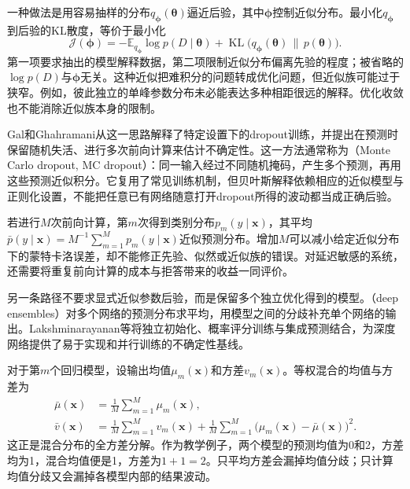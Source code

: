 一种做法是用容易抽样的分布$q_{\bm{\phi}}(\bm{\theta})$逼近后验，其中$\bm{\phi}$控制近似分布。最小化$q_{\bm{\phi}}$到后验的KL散度，等价于最小化
\begin{equation}
 \mathcal J(\bm{\phi})
 =-\mathbb E_{q_{\bm{\phi}}}\log p(D\mid\bm{\theta})
   +\operatorname{KL}\bigl(q_{\bm{\phi}}(\bm{\theta})
                    \,\|\,p(\bm{\theta})\bigr).
 \label{eq:reliability-variational-objective}
\end{equation}
第一项要求抽出的模型解释数据，第二项限制近似分布偏离先验的程度；被省略的$\log p(D)$与$\bm{\phi}$无关。这种近似把难积分的问题转成优化问题，但近似族可能过于狭窄。例如，彼此独立的单峰参数分布未必能表达多种相距很远的解释。优化收敛也不能消除近似族本身的限制。

Gal和Ghahramani从这一思路解释了特定设置下的dropout训练，并提出在预测时保留随机失活、进行多次前向计算来估计不确定性。这一方法通常称为（Monte Carlo dropout, MC dropout）：同一输入经过不同随机掩码，产生多个预测，再用这些预测近似积分。它复用了常见训练机制，但贝叶斯解释依赖相应的近似模型与正则化设置，不能把任意已有网络随意打开dropout所得的波动都当成正确后验。

若进行$M$次前向计算，第$m$次得到类别分布$p_m(y\mid\bm{x})$，其平均$\bar p(y\mid\bm{x})=M^{-1}\sum_{m=1}^{M}p_m(y\mid\bm{x})$近似预测分布。增加$M$可以减小给定近似分布下的蒙特卡洛误差，却不能修正先验、似然或近似族的错误。对延迟敏感的系统，还需要将重复前向计算的成本与拒答带来的收益一同评价。

另一条路径不要求显式近似参数后验，而是保留多个独立优化得到的模型。（deep ensembles）对多个网络的预测分布求平均，用模型之间的分歧补充单个网络的输出。Lakshminarayanan等将独立初始化、概率评分训练与集成预测结合，为深度网络提供了易于实现和并行训练的不确定性基线。

对于第$m$个回归模型，设输出均值$\mu_m(\bm{x})$和方差$v_m(\bm{x})$。等权混合的均值与方差为
\begin{equation}
 \begin{aligned}
 \bar\mu(\bm{x})&=\frac1M\sum_{m=1}^{M}\mu_m(\bm{x}),\\
 \bar v(\bm{x})&=\frac1M\sum_{m=1}^{M}v_m(\bm{x})
  +\frac1M\sum_{m=1}^{M}
       \bigl(\mu_m(\bm{x})-\bar\mu(\bm{x})\bigr)^2.
 \end{aligned}
 \label{eq:reliability-ensemble-variance}
\end{equation}
这正是混合分布的全方差分解。作为教学例子，两个模型的预测均值为0和2，方差均为1，混合均值便是1，方差为$1+1=2$。只平均方差会漏掉均值分歧；只计算均值分歧又会漏掉各模型内部的结果波动。

